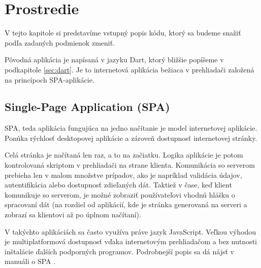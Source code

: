 \chapter{Prostredie}

\label{kap:prostredie} %

V tejto kapitole si predstavíme vstupný popis kódu, ktorý sa budeme snažiť podľa zadaných podmienok zmeniť.

Pôvodná aplikácia je napísaná v jazyku Dart, ktorý bližšie popíšeme v podkapitole \ref{sec:dart}. Je to internetová aplikácia bežiaca v prehliadači založená na princípoch SPA-aplikácie.

\section{Single-Page Application (SPA)}
SPA, teda aplikácia fungujúca na jedno načítanie je model internetovej aplikácie. Ponúka rýchlosť desktopovej aplikácie a zároveň dostupnosť internetovej stránky.

Celá stránka je načítaná len raz, a to na začiatku. Logika aplikácie je potom kontrolovaná skriptom v prehliadači na strane klienta. 
Komunikácia so serverom prebieha len v malom množstve prípadov, ako je napríklad validácia údajov, autentifikácia alebo dostupnosť zdieľaných dát. 
Taktiež v čase, keď klient komunikuje so serverom, je možné zobraziť používateľovi vhodnú hlášku o spracovaní dát (na rozdiel od aplikácií, kde je stránka generovaná na serveri a zobrazí sa klientovi až po úplnom načítaní).

V takýchto aplikáciách sa často využíva práve jazyk JavaScript. Veľkou výhodou je multiplatformová dostupnosť vďaka internetovým prehliadačom a bez nutnosti inštalácie ďalších podporných programov. Podrobnejší popis sa dá nájsť v manuáli o SPA \cite{SPA}.


